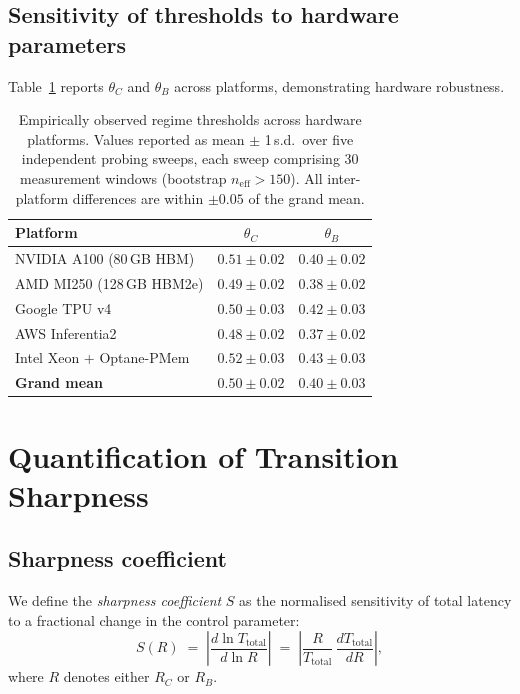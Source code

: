 \subsection{Sensitivity of thresholds to hardware parameters}
\label{app:sensitivity}

Table~\ref{tab:threshold_sensitivity} reports $\theta_C$ and $\theta_B$ across
platforms, demonstrating hardware robustness.

\begin{table}[h]
\centering
\caption{Empirically observed regime thresholds across hardware platforms.
Values reported as mean $\pm$ 1\,s.d.\ over five independent probing sweeps,
each sweep comprising 30 measurement windows (bootstrap $n_{\mathrm{eff}}>150$).
All inter-platform differences are within $\pm 0.05$ of the grand mean.}
\label{tab:threshold_sensitivity}
\begin{tabular}{lcc}
\toprule
\textbf{Platform} & $\theta_C$ & $\theta_B$ \\
\midrule
NVIDIA A100 (80\,GB HBM)  & $0.51 \pm 0.02$ & $0.40 \pm 0.02$ \\
AMD MI250 (128\,GB HBM2e) & $0.49 \pm 0.02$ & $0.38 \pm 0.02$ \\
Google TPU v4             & $0.50 \pm 0.03$ & $0.42 \pm 0.03$ \\
AWS Inferentia2           & $0.48 \pm 0.02$ & $0.37 \pm 0.02$ \\
Intel Xeon + Optane-PMem  & $0.52 \pm 0.03$ & $0.43 \pm 0.03$ \\
\midrule
\textbf{Grand mean}       & $0.50 \pm 0.02$ & $0.40 \pm 0.03$ \\
\bottomrule
\end{tabular}
\end{table}


\section{Quantification of Transition Sharpness}
\label{app:sharpness}

\subsection{Sharpness coefficient}

We define the \emph{sharpness coefficient} $S$ as the normalised sensitivity
of total latency to a fractional change in the control parameter:
\begin{equation}
S(R) \;=\; \left|\frac{d\ln T_{\mathrm{total}}}{d\ln R}\right|
       \;=\; \left|\frac{R}{T_{\mathrm{total}}}\,
              \frac{dT_{\mathrm{total}}}{dR}\right|,
\label{eq:sharpness}
\end{equation}
where $R$ denotes either $R_C$ or $R_B$.

